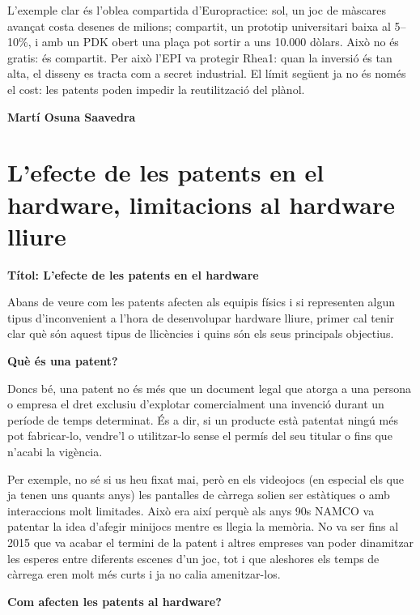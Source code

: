 \documentclass[catalan, a4paper]{article}
\begin{document}
L'exemple clar és l'oblea compartida d'Europractice: sol, un joc de màscares avançat costa desenes de milions; compartit, un prototip universitari baixa al 5--10\%, i amb un PDK obert una plaça pot sortir a uns 10.000 dòlars. Això no és gratis: és compartit. Per això l'EPI va protegir Rhea1: quan la inversió és tan alta, el disseny es tracta com a secret industrial. El límit següent ja no és només el cost: les patents poden impedir la reutilització del plànol.
\clearpage

{\bfseries\color{accent} Martí Osuna Saavedra \par}\vspace{-0.4cm}
\section{L'efecte de les patents en el hardware, limitacions al hardware lliure}
\textbf{Títol: L'efecte de les patents en el hardware}

Abans de veure com les patents afecten als equipis físics i si representen algun tipus
d'inconvenient a l'hora de desenvolupar hardware lliure, primer cal tenir clar què són
aquest tipus de llicències i quins són els seus principals objectius.
\vspace{1em}

\textbf{Què és una patent?}

Doncs bé, una patent no és més que un document legal que atorga a una persona o empresa el
dret exclusiu d'explotar comercialment una invenció durant un període de temps determinat.
És a dir, si un producte està patentat ningú més pot fabricar-lo, vendre'l o utilitzar-lo sense
el permís del seu titular o fins que n'acabi la vigència.

\vspace{1em}

Per exemple, no sé si us heu fixat mai, però en els videojocs (en especial els que ja tenen uns
quants anys) les pantalles de càrrega solien ser estàtiques o amb interaccions molt limitades. Això
era així perquè als anys 90s NAMCO va patentar la idea d'afegir minijocs mentre es llegia la memòria.
No va ser fins al 2015 que va acabar el termini de la patent i altres empreses van poder dinamitzar les esperes
entre diferents escenes d'un joc, tot i que aleshores els temps de càrrega eren molt més curts i 
ja no calia amenitzar-los.

\vspace{1em}

\textbf{Com afecten les patents al hardware?}
\end{document}
